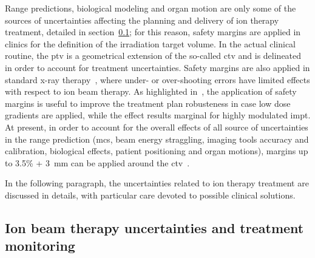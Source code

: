 Range predictions, biological modeling and organ motion are only some of the sources of uncertainties affecting the planning and delivery of ion therapy treatment, detailed in section~\ref{chap1::subsec::uncertainty}; for this reason, safety margins  are applied in clinics for the definition of the irradiation target volume. In the actual clinical routine, the \gls{ptv} is a geometrical extension of the so-called \gls{ctv} and is delineated in order to account for treatment uncertainties. Safety margins are also applied in standard x-ray therapy~\parencite{McKenzie2000}, where under- or over-shooting errors have limited effects with respect to ion beam therapy. As highlighted in~\cite{Albertini2011},  the application of safety margins is useful to improve the treatment plan robusteness in case low dose gradients are applied, while the effect results marginal for highly modulated \gls{impt}. At present, in order to account for the overall effects of all source of uncertainties in the range prediction (\gls{mcs}, beam energy straggling, imaging tools accuracy and calibration, biological effects, patient positioning and organ motions), margins up to 3.5\% + 3~mm can be applied around the \gls{ctv}~\parencite{Paganetti2012}. 

In the following paragraph, the uncertainties related to ion therapy treatment are discussed in details, with particular care devoted to possible clinical solutions.

\subsection{Ion beam therapy uncertainties and treatment monitoring}\label{chap1::subsec::uncertainty}

